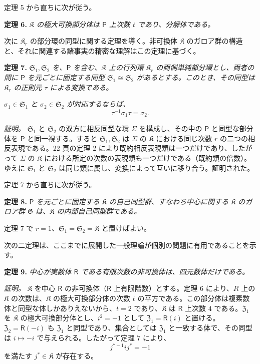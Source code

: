 定理 5 から直ちに次が従う。

\textbf{定理 6.} \emph{$\mathfrak K$ の極大可換部分体は $\mathsf P$ 上次数 $t$ であり、分解体である。}

次に $\mathfrak K_r$ の部分環の同型に関する定理を導く。非可換体 $\mathfrak K$ のガロア群の構造と、それに関連する諸事実の精密な理解はこの定理に基づく。

\textbf{定理 7.} \emph{$\mathfrak S_1,\mathfrak S_2$ を、$\mathsf P$ を含む、$\mathfrak K$ 上の行列環 $\mathfrak K_r$ の両側単純部分環とし、両者の間に $\mathsf P$ を元ごとに固定する同型 $\mathfrak S_1\cong\mathfrak S_2$ があるとする。このとき、その同型は $\mathfrak K_r$ の正則元 $\tau$ による変換である。}

\emph{$\sigma_1\in\mathfrak S_1$ と $\sigma_2\in\mathfrak S_2$ が対応するならば、}
\[
\tau^{-1}\sigma_1\tau=\sigma_2.
\]

\emph{証明。} $\mathfrak S_1$ と $\mathfrak S_2$ の双方に相反同型な環 $\Sigma$ を構成し、その中の $\mathsf P$ と同型な部分体を $\mathsf P$ と同一視する。すると $\mathfrak S_1,\mathfrak S_2$ は $\Sigma$ の $\mathfrak K$ における同じ次数 $r$ の二つの相反表現である。22 頁の定理 2 により既約相反表現類は一つだけであり、したがって $\Sigma$ の $\mathfrak K$ における所定の次数の表現類も一つだけである（既約類の倍数）。ゆえに $\mathfrak S_1$ と $\mathfrak S_2$ は同じ類に属し、変換によって互いに移り合う。証明された。

定理 7 から直ちに次が従う。

\textbf{定理 8.} \emph{$\mathsf P$ を元ごとに固定する $\mathfrak K$ の自己同型群、すなわち中心に関する $\mathfrak K$ のガロア群 $\mathfrak G$ は、$\mathfrak K$ の内部自己同型群である。}

定理 7 で $r=1$、$\mathfrak S_1=\mathfrak S_2=\mathfrak K$ と置けばよい。

次の二定理は、ここまでに展開した一般理論が個別の問題に有用であることを示す。

\textbf{定理 9.} \emph{中心が実数体 $\mathsf{R}$ である有限次数の非可換体は、四元数体だけである。}

\emph{証明。} $\mathfrak K$ を中心 $\mathsf{R}$ の非可換体（$\mathsf{R}$ 上有限階数）とする。定理 6 により、$R$ 上の $\mathfrak K$ の次数は、$\mathfrak K$ の極大可換部分体の次数 $t$ の平方である。この部分体は複素数体と同型な体しかありえないから、$t=2$ であり、$\mathfrak K$ は $\mathsf{R}$ 上次数 $4$ である。$\mathfrak Z_1$ を $\mathfrak K$ の極大可換部分体とし、$i^2=-1$ として $\mathfrak Z_1=\mathsf{R}(i)$ と置ける。$\mathfrak Z_2=\mathsf{R}(-i)$ も $\mathfrak Z_1$ と同型であり、集合としては $\mathfrak Z_1$ と一致する体で、その同型は $i\mapsto-i$ で与えられる。したがって定理 7 により、
\[
j^{*-1}ij^*=-1
\]
を満たす $j^*\in\mathfrak K$ が存在する。

